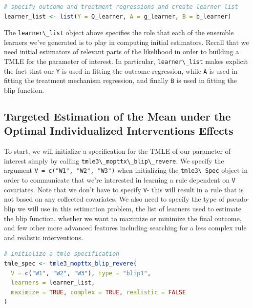 \documentclass[12pt, krantz2,]{krantz}
\newcommand{\passthrough}[1]{#1}
\theoremstyle{definition}
\theoremstyle{definition}
\theoremstyle{definition}
\newcommand{\1}{\mathbbm{1}}
\begin{document}
\begin{lstlisting}[language=R]
# specify outcome and treatment regressions and create learner list
learner_list <- list(Y = Q_learner, A = g_learner, B = b_learner)
\end{lstlisting}

The \passthrough{\lstinline!learner\_list!} object above specifies the role that each of the ensemble
learners we've generated is to play in computing initial estimators. Recall that
we need initial estimators of relevant parts of the likelihood in order to
building a TMLE for the parameter of interest. In particular, \passthrough{\lstinline!learner\_list!}
makes explicit the fact that our \passthrough{\lstinline!Y!} is used in fitting the outcome regression,
while \passthrough{\lstinline!A!} is used in fitting the treatment mechanism regression, and finally \passthrough{\lstinline!B!}
is used in fitting the blip function.

\hypertarget{targeted-estimation-of-the-mean-under-the-optimal-individualized-interventions-effects}{%
\subsection{Targeted Estimation of the Mean under the Optimal Individualized Interventions Effects}\label{targeted-estimation-of-the-mean-under-the-optimal-individualized-interventions-effects}}

To start, we will initialize a specification for the TMLE of our parameter of
interest simply by calling \passthrough{\lstinline!tmle3\_mopttx\_blip\_revere!}. We specify the argument
\passthrough{\lstinline!V = c("W1", "W2", "W3")!} when initializing the \passthrough{\lstinline!tmle3\_Spec!} object in order to
communicate that we're interested in learning a rule dependent on \passthrough{\lstinline!V!}
covariates. Note that we don't have to specify \passthrough{\lstinline!V!}- this will result in a rule
that is not based on any collected covariates. We also need to specify the type
of pseudo-blip we will use in this estimation problem, the list of learners used
to estimate the blip function, whether we want to maximize or minimize the final
outcome, and few other more advanced features including searching for a less
complex rule and realistic interventions.

\begin{lstlisting}[language=R]
# initialize a tmle specification
tmle_spec <- tmle3_mopttx_blip_revere(
  V = c("W1", "W2", "W3"), type = "blip1",
  learners = learner_list,
  maximize = TRUE, complex = TRUE, realistic = FALSE
)
\end{lstlisting}
\end{document}
